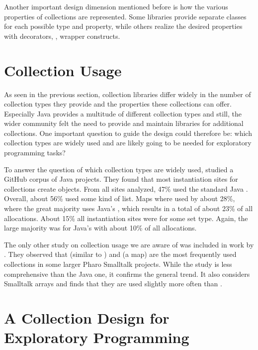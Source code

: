 \documentclass[sigconf, authorversion]{acmart}
\begin{document}
Another important design dimension mentioned before is
how the various properties of collections are represented.
Some libraries provide separate classes for each possible type and property,
while others realize the desired properties with decorators,
\ie, wrapper constructs.

\section{Collection Usage}
\label{sec:usage}

As seen in the previous section,
collection libraries differ widely
in the number of collection types they provide
and the properties these collections can offer.
Especially Java provides a multitude of different collection types and still,
the wider community felt the need to provide and maintain libraries
for additional collections.
One important question to guide the design could therefore be:
which collection types are widely used and are likely going to be needed
for exploratory programming tasks?

To answer the question of which collection types are widely used,
\citet{Costa:2017:ESU} studied a GitHub corpus of Java projects\citep{6624029}.
They found that most instantiation sites for collections
create  objects.
From all sites analyzed, 47\% used the standard Java .
Overall, about 56\% used some kind of list.
Maps where used by about 28\%,
where the great majority uses Java's ,
which results in a total of about 23\% of all allocations.
About 15\% all instantiation sites were for some set type.
Again, the large majority was for Java's 
with about 10\% of all allocations.

The only other study on collection usage we are aware of
was included in work by \citet[sec. 9.2]{Bergel:2018}.
They observed that  (similar to )
and  (a map) are the most frequently used collections
in some larger Pharo Smalltalk projects.
While the study is less comprehensive than the Java one,
it confirms the general trend.
It also considers Smalltalk arrays
and finds that they are used slightly more often than .

\section{A Collection Design for Exploratory Programming}
\end{document}
